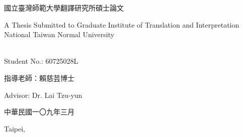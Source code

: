 \makeatletter
\begin{titlepage}%
  \begin{center}%
    {\large 國立臺灣師範大學翻譯研究所碩士論文\par}

    {\large A Thesis Submitted to Graduate Institute of Translation and Interpretation National Taiwan Normal University\par}
    \par
  \end{center}%
  \vspace{1cm plus 1fill}
  \begin{flushleft}%
    {{\Large\bfseries \@author}\\
      Student No.: 60725028L\par}
  \end{flushleft}%
  \vspace{8mm plus 1mm minus 2mm}
  \begin{center}%
    {\Large\textbf{\titlezh}\par}\par
    \vspace{1em}
    {\huge\textbf{\@title}\par}
    \vspace{2cm plus 1.5fill}
    {\large 指導老師：賴慈芸博士}\par
    \vspace{0.5em}
    {\large Advisor: Dr. Lai Tzu-yun}\par
    \vspace{2cm}
    {\large 中華民國一〇九年三月}\par
    \vspace{0.5em}
    {\large Taipei, \@date}
  \end{center}
\end{titlepage}%
\makeatother
